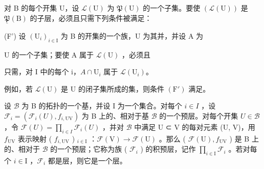 对 B 的每个开集 U，设 \(\mathcal{L}(\mathrm{U})\) 为 \(\mathfrak{P}(\mathrm{U})\) 的一个子集。要使 \((\mathcal{L}(\mathrm{U}))\) 是 \(\underline{\mathfrak{P}}(\mathrm{B})\) 的子层，必须且只需下列条件被满足：

(F') 设 \((\mathrm{U}_{i})_{i\in\mathrm{I}}\) 为 B 的开集的一个族，U 为其并，并设 A 为

U 的一个子集；要使 A 属于 \(\mathcal{L}(\mathrm{U})\) ，必须且

只需，对 I 中的每个 i，\(A \cap \mathrm{U}_{i}\) 属于 \(\mathcal{L}(\mathrm{U}_{i})\)。

例如，若 \(\mathcal{L}(\mathrm{U})\) 是 U 的闭子集所成的集，则条件 \((\mathrm{F}')\) 满足。


设 \(\mathcal{B}\) 为 B 的拓扑的一个基，并设 I 为一个集合。对每个 \(i \in I\) ，设 \(\mathcal{F}_{i} = (\mathcal{F}_{i}(U), f_{i,\mathrm{UV}})\) 为 B 上的、相对于基 \(\mathcal{B}\) 的一个预层。对每个开集 \(U \in \mathcal{B}\) ，令 \(\mathcal{F}(U) = \prod_{i \in I} \mathcal{F}_{i}(U)\) ，并对 \(\mathcal{B}\) 中满足 U ⊂ V 的每对元素 (U, V)，用 \(f_{\mathrm{UV}}\) 表示映射 ( \(f_{i,\mathrm{UV}}\) ) \(_{i\in\mathrm{I}}\) ：\(\mathcal{F}(\mathrm{V}) \to \mathcal{F}(\mathrm{U})\) 。那么 ( \(\mathcal{F}(\mathrm{U}), f_{\mathrm{UV}} \) ) 是 B 上的、相对于 \(\mathcal{B}\) 的一个预层；它称为族 ( \(\mathcal{F}_i\) ) 的积预层，记作 \(\prod_{i\in\mathrm{I}}\mathcal{F}_i\) 。若对每个 \(i \in \mathrm{I}\) ，\(\mathcal{F}_i\) 都是层，则它是一个层。

